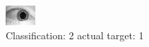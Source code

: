 \begin{figure}[h!]
\begin{center}
\includegraphics[width=0.60\columnwidth]{figures/ID1589_class_2_target_1.png}
\end{center}
\caption{ Classification: 2 actual target: 1}
\label{fig:ID1589_class_2_target_1}
\end{figure}

